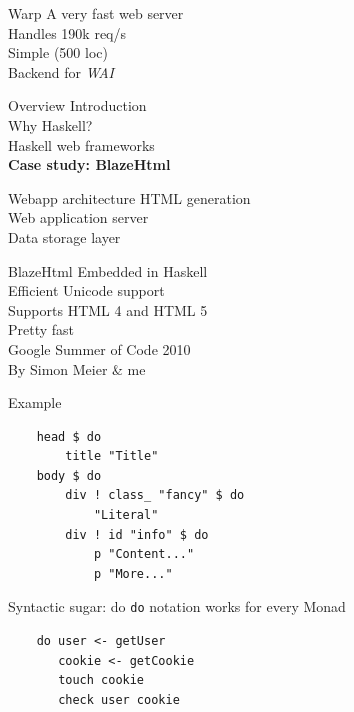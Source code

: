 \documentclass[20pt]{beamer}
\newcommand{\vspaced}{
    \vspace{5mm}
}
\begin{document}
\begin{frame}{Warp}
    A very fast web server \\
    Handles 190k req/s \\
    Simple (500 loc) \\
    Backend for \emph{WAI} \\
\end{frame}


\begin{frame}{Overview}
    Introduction \\
    Why Haskell? \\
    Haskell web frameworks \\
    \textbf{Case study: BlazeHtml} \\
\end{frame}

\begin{frame}{Webapp architecture}
    HTML generation \\
    Web application server \\
    Data storage layer
\end{frame}

\begin{frame}{BlazeHtml}
    Embedded in Haskell \\
    Efficient Unicode support \\
    Supports HTML 4 and HTML 5 \\
    Pretty fast \\
    Google Summer of Code 2010 \\
    By Simon Meier \& me
\end{frame}

\begin{frame}[fragile]{Example}
    \begin{lstlisting}
    head $ do
        title "Title"
    body $ do
        div ! class_ "fancy" $ do
            "Literal"
        div ! id "info" $ do
            p "Content..."
            p "More..."
    \end{lstlisting}
\end{frame}

\begin{frame}[fragile]{Syntactic sugar: do}
    \texttt{do} notation works for every Monad
    \vspaced
    \begin{lstlisting}
    do user <- getUser
       cookie <- getCookie
       touch cookie
       check user cookie
    \end{lstlisting}
\end{frame}
\end{document}
